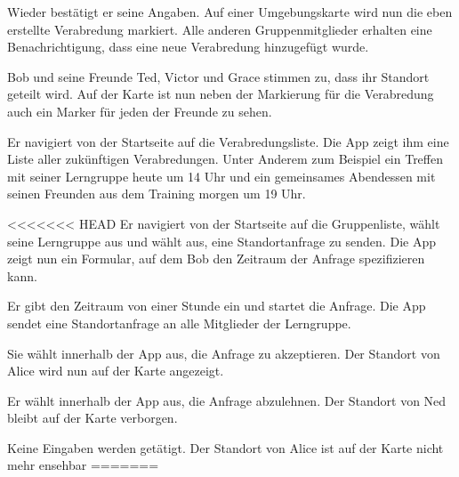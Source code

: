 \documentclass[parskip=full,11pt]{scrartcl}
\begin{document}
{Wieder bestätigt er seine Angaben.}
{Auf einer Umgebungskarte wird nun die eben erstellte Verabredung markiert.
Alle anderen Gruppenmitglieder erhalten eine Benachrichtigung,
dass eine neue Verabredung hinzugefügt wurde.}

{Bob und seine Freunde Ted, Victor und Grace stimmen zu, dass ihr Standort geteilt wird.}
{Auf der Karte ist nun neben der Markierung für die Verabredung auch ein Marker für
jeden der Freunde zu sehen.}


{Er navigiert von der Startseite auf die Verabredungsliste.}
{Die App zeigt ihm eine Liste aller zukünftigen Verabredungen.
Unter Anderem zum Beispiel ein Treffen mit seiner Lerngruppe heute um 14 Uhr
und ein gemeinsames Abendessen mit seinen Freunden aus dem Training morgen um 19 Uhr.}

<<<<<<< HEAD
{Er navigiert von der Startseite auf die Gruppenliste, wählt seine Lerngruppe aus und wählt aus, eine Standortanfrage zu senden.}
{Die App zeigt nun ein Formular, auf dem Bob den Zeitraum der Anfrage spezifizieren kann.}

{Er gibt den Zeitraum von einer Stunde ein und startet die Anfrage.}
{Die App sendet eine Standortanfrage an alle Mitglieder der Lerngruppe.}

{Sie wählt innerhalb der App aus, die Anfrage zu akzeptieren.}
{Der Standort von Alice wird nun auf der Karte angezeigt.}

{Er wählt innerhalb der App aus, die Anfrage abzulehnen.}
{Der Standort von Ned bleibt auf der Karte verborgen.}

{Keine Eingaben werden getätigt.}
{Der Standort von Alice ist auf der Karte nicht mehr ensehbar}
=======
\end{document}

